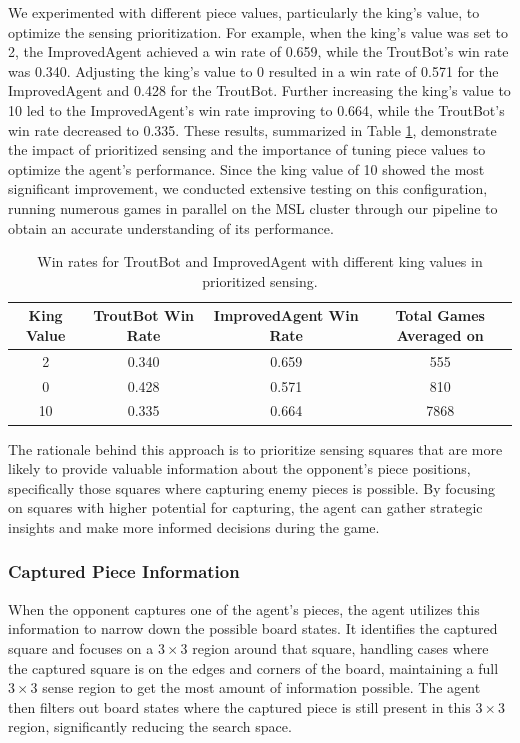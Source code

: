 \documentclass[10pt]{article}
\begin{document}
We experimented with different piece values, particularly the king's value, to optimize the sensing prioritization. For example, when the king's value was set to 2, the ImprovedAgent achieved a win rate of 0.659, while the TroutBot's win rate was 0.340. Adjusting the king's value to 0 resulted in a win rate of 0.571 for the ImprovedAgent and 0.428 for the TroutBot. Further increasing the king's value to 10 led to the ImprovedAgent's win rate improving to 0.664, while the TroutBot's win rate decreased to 0.335. These results, summarized in Table \ref{tab:win_rates}, demonstrate the impact of prioritized sensing and the importance of tuning piece values to optimize the agent's performance. Since the king value of 10 showed the most significant improvement, we conducted extensive testing on this configuration, running numerous games in parallel on the MSL cluster through our pipeline to obtain an accurate understanding of its performance.

\begin{table}[h]
  \centering
  \begin{tabular}{|c|c|c|c|}
  \hline
  \textbf{King Value} & \textbf{TroutBot Win Rate} & \textbf{ImprovedAgent Win Rate} & \textbf{Total Games Averaged on} \\
  \hline
  2 & 0.340 & 0.659 & 555 \\
  \hline
  0 & 0.428 & 0.571 & 810 \\
  \hline
  10 & 0.335 & 0.664 & 7868 \\
  \hline
  \end{tabular}
  \caption{Win rates for TroutBot and ImprovedAgent with different king values in prioritized sensing.}
  \label{tab:win_rates}
\end{table}

The rationale behind this approach is to prioritize sensing squares that are more likely to provide valuable information about the opponent's piece positions, specifically those squares where capturing enemy pieces is possible. By focusing on squares with higher potential for capturing, the agent can gather strategic insights and make more informed decisions during the game.

\subsubsection{Captured Piece Information}
When the opponent captures one of the agent's pieces, the agent utilizes this information to narrow down the possible board states. It identifies the captured square and focuses on a $3\times3$ region around that square, handling cases where the captured square is on the edges and corners of the board, maintaining a full $3\times3$ sense region to get the most amount of information possible. The agent then filters out board states where the captured piece is still present in this $3\times3$ region, significantly reducing the search space.
\end{document}
